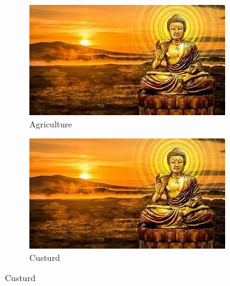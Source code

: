 \documentclass{article}
\begin{document}
		
	
	
	\begin{figure}[h]
		
		\begin{subfigure}{0.5\textwidth}
			\centering
			\includegraphics[width=\linewidth]{demo.jpg}
			\caption{ Agriculture} 
			\label{fig:image1}
			\end{subfigure}
		 
		
		\hfill
		
		
	
			\begin{subfigure}{0.5\textwidth}
				\centering
				\includegraphics[width=\linewidth]{demo.jpg}
				\caption{ Custurd}
				\label{fig:image2}
			\end{subfigure}
		\end{figure}
			
			
\end{document}
